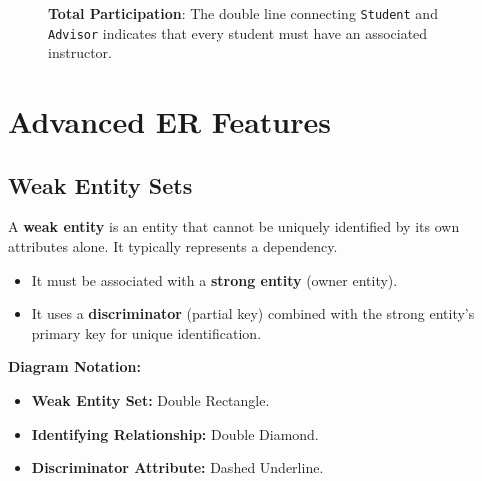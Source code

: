 \documentclass[12pt,a4paper]{article}
\begin{document}
\begin{figure}[H]
    \centering
    \caption{\textbf{Total Participation}: The double line connecting \texttt{Student} and \texttt{Advisor} indicates that every student must have an associated instructor.}
\end{figure}

\newpage
\section{Advanced ER Features}

\subsection{Weak Entity Sets}
A \textbf{weak entity} is an entity that cannot be uniquely identified by its own attributes alone. It typically represents a dependency.
\begin{itemize}
    \item It must be associated with a \textbf{strong entity} (owner entity).
    \item It uses a \textbf{discriminator} (partial key) combined with the strong entity's primary key for unique identification.
\end{itemize}

\textbf{Diagram Notation:}
\begin{itemize}
    \item \textbf{Weak Entity Set:} Double Rectangle.
    \item \textbf{Identifying Relationship:} Double Diamond.
    \item \textbf{Discriminator Attribute:} Dashed Underline.
\end{itemize}
\end{document}
